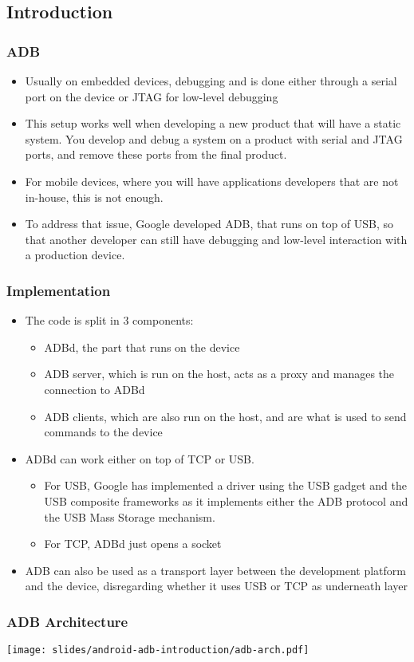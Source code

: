 \subsection{Introduction}
\begin{frame}
  \frametitle{ADB}
  \begin{itemize}
  \item Usually on embedded devices, debugging and is done either
    through a serial port on the device or JTAG for low-level
    debugging
  \item This setup works well when developing a new product that will
    have a static system. You develop and debug a system on a product
    with serial and JTAG ports, and remove these ports from the final
    product.
  \item For mobile devices, where you will have applications
    developers that are not in-house, this is not enough.
  \item To address that issue, Google developed ADB, that runs on top
    of USB, so that another developer can still have debugging and
    low-level interaction with a production device.
  \end{itemize}
\end{frame}

\begin{frame}
  \frametitle{Implementation}
  \begin{itemize}
  \item The code is split in 3 components:
    \begin{itemize}
    \item ADBd, the part that runs on the device
    \item ADB server, which is run on the host, acts as a proxy and
      manages the connection to ADBd
    \item ADB clients, which are also run on the host, and are
      what is used to send commands to the device
    \end{itemize}
  \item ADBd can work either on top of TCP or USB.
    \begin{itemize}
    \item For USB, Google has implemented a driver using the USB
      gadget and the USB composite frameworks as it implements either
      the ADB protocol and the USB Mass Storage mechanism.
    \item For TCP, ADBd just opens a socket
    \end{itemize}
  \item ADB can also be used as a transport layer between the
    development platform and the device, disregarding whether it uses
    USB or TCP as underneath layer
  \end{itemize}
\end{frame}

\begin{frame}
  \frametitle{ADB Architecture}
  \begin{center}
    \texttt{[image: slides/android-adb-introduction/adb-arch.pdf]}
  \end{center}
\end{frame}
